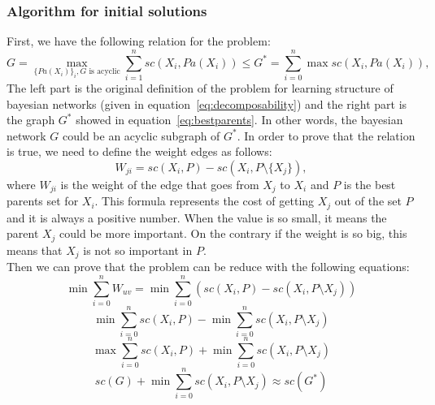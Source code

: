 \subsubsection{Algorithm for initial solutions}
\label{subsub:fasalgorithm}
	First, we have the following relation for the problem:
		\begin{equation}
			\label{eq:reduction}
			G = \max_{\{ {Pa}(X_i)\}_i, G \text{ is acyclic}} \sum_{i=1}^n {sc}( X_i , {Pa}( X_i ) ) \leq G^* = \sum_{i=0}^{n} \max {sc}( X_i , {Pa}( X_i ) ) ,
		\end{equation}
	The left part is the original definition of the problem for learning structure of bayesian networks (given in equation~\ref{eq:decomposability}) and the right part is the graph $G^*$ showed in equation~\ref{eq:bestparents}. In other words, the bayesian network $G$ could be an acyclic subgraph of $G^*$. 
	In order to prove that the relation is true, we need to define the weight edges as follows:
		\begin{equation}
			\label{eq:weight}
			W_{ji} = {sc}( X_i , P ) - {sc}( X_i , P \setminus \{ X_j \} ) ,
		\end{equation}
	where $W_{ji}$ is the weight of the edge that goes from $X_j$ to $X_i$ and $P$ is the best parents set for $X_i$. This formula represents the cost of getting $X_j$ out of the set $P$ and it is always a positive number. When the value is so small, it means the parent $X_j$ could be more important. On the contrary if the weight is so big, this means that $X_j$ is not so important in $P$.\\
	Then we can prove that the problem can be reduce with the following equations:
	\begin{equation}
		\label{eq:prove1}
		\min \sum_{i=0}^{n} W_{uv} = \min \sum_{i=0}^{n} ( {sc}( X_i , P ) - {sc}( X_i , P \setminus X_j ) )
	\end{equation}
	\begin{equation}
		\label{eq:prove2}
		\min \sum_{i=0}^{n} {sc}( X_i , P ) - \min \sum_{i=0}^{n} {sc}( X_i , P \setminus X_j )
	\end{equation}
	\begin{equation}
		\label{eq:prove3}
		\max \sum_{i=0}^{n} {sc}( X_i , P ) + \min \sum_{i=0}^{n} {sc}( X_i , P \setminus X_j )
	\end{equation}
	\begin{equation}
		\label{eq:prove4}
		{sc}( G ) + \min \sum_{i=0}^{n} {sc}( X_i , P \setminus X_j ) \approx {sc}( G^* )
	\end{equation}
